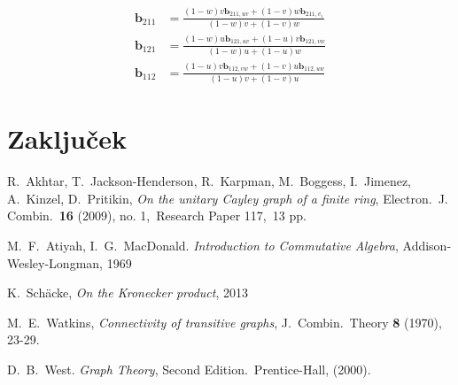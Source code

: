 \documentclass[a4paper,12pt]{article}
\newcommand{\tbf}{\textbf}
\begin{document}
\begin{align*}
\tbf{b}_{211} &= \frac{(1-w)v \tbf{b}_{211,uv}+(1-v)w\tbf{b}_{211,v_1}}{(1-w)v+(1-v)w} \\
\tbf{b}_{121} &= \frac{(1-w)u \tbf{b}_{121,uv}+(1-u)v\tbf{b}_{121,vw}}{(1-w)u+(1-u)w} \\
\tbf{b}_{112} &= \frac{(1-u)v \tbf{b}_{112,vw}+(1-v)u\tbf{b}_{112,uw}}{(1-u)v+(1-v)u} 
\end{align*}

\section{Zaključek}



\begin{thebibliography}{99}
	
	R.~Akhtar, T.~Jackson-Henderson, R.~Karpman, M.~Boggess, I.~Jimenez, A.~Kinzel, D.~Pritikin, \emph{On the unitary Cayley graph of a finite ring}, Electron.\ J. Combin.\ \textbf{16} (2009), no. 1,\ Research Paper 117,\ 13 pp.
	
	M.~F.~Atiyah, I.~G.~MacDonald. \emph{Introduction to Commutative Algebra}, Addison-Wesley-Longman, 1969
	
	
	K.~Schäcke, \emph{On the Kronecker product}, 2013
	
	M.~E.~Watkins, \emph{Connectivity of transitive graphs}, J.~Combin.\ Theory \textbf{8} (1970), 23-29.
	
	D.~B.~West. \emph{Graph Theory}, Second Edition.\ Prentice-Hall, (2000).
	
\end{thebibliography}
\end{document}
